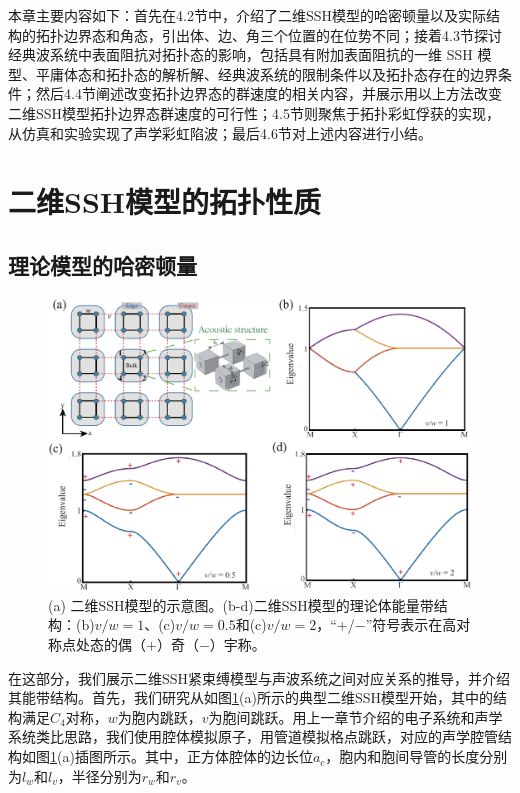 本章主要内容如下：首先在4.2节中，介绍了二维SSH模型的哈密顿量以及实际结构的拓扑边界态和角态，引出体、边、角三个位置的在位势不同；接着4.3节探讨经典波系统中表面阻抗对拓扑态的影响，包括具有附加表面阻抗的一维 SSH 模型、平庸体态和拓扑态的解析解、经典波系统的限制条件以及拓扑态存在的边界条件；然后4.4节阐述改变拓扑边界态的群速度的相关内容，并展示用以上方法改变二维SSH模型拓扑边界态群速度的可行性；4.5节则聚焦于拓扑彩虹俘获的实现，从仿真和实验实现了声学彩虹陷波；最后4.6节对上述内容进行小结。

\section{二维SSH模型的拓扑性质}

\subsection{理论模型的哈密顿量}
\begin{figure}[h!]
    \centering
    \includegraphics[width=1\textwidth]{images/fig4-1.eps} 
    \caption{(a) 二维SSH模型的示意图。(b-d)二维SSH模型的理论体能量带结构：(b)$v/w = 1$、(c)$v/w = 0.5$和(c)$v/w = 2$，“+/−”符号表示在高对称点处态的偶（+）奇（−）宇称。}
    \label{fig_4_1}
  \end{figure}  

在这部分，我们展示二维SSH紧束缚模型与声波系统之间对应关系的推导，并介绍其能带结构。首先，我们研究从如图\ref{fig_4_1}(a)所示的典型二维SSH模型开始，其中的结构满足$C_4$对称，$w$为胞内跳跃，$v$为胞间跳跃。用上一章节介绍的电子系统和声学系统类比思路，我们使用腔体模拟原子，用管道模拟格点跳跃，对应的声学腔管结构如图\ref{fig_4_1}(a)插图所示。其中，正方体腔体的边长位$a_c$，胞内和胞间导管的长度分别为$l_w$和$l_v$，半径分别为$r_w$和$r_v$。

